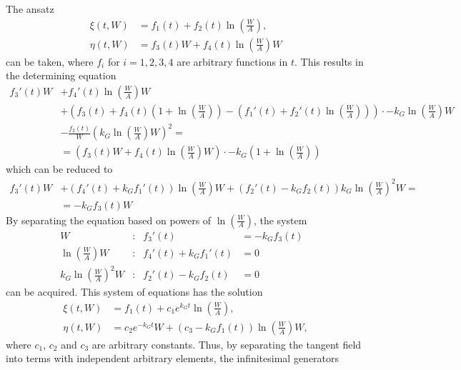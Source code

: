 The ansatz
\begin{align*}
  \xi(t, W) &= f_1(t) + f_2(t) \ln\left(\frac{W}{A}\right),\\
  \eta(t, W) &= f_3(t) W + f_4(t) \ln\left(\frac{W}{A}\right) W
\end{align*}
can be taken, where \(f_i\) for \(i =1,2,3,4\) are arbitrary functions in \(t\).
This results in the determining equation
\begin{align*}
  f_3'(t) W &+ f_4'(t) \ln\left(\frac{W}{A}\right) W \\
  &+ \left( f_3(t) + f_4(t) \left( 1 + \ln\left(\frac{W}{A}\right) \right) - \left( f_1'(t) + f_2'(t) \ln\left(\frac{W}{A}\right) \right) \right) \cdot -k_G \ln\left(\frac{W}{A}\right) W \\
  &- \frac{f_2(t)}{W} \left( k_G \ln\left(\frac{W}{A}\right) W \right)^2 =\\
  &= \left( f_3(t) W + f_4(t) \ln\left(\frac{W}{A}\right) W \right) \cdot -k_G \left( 1 + \ln\left(\frac{W}{A}\right) \right)
\end{align*}
which can be reduced to
\begin{align*}
  f_3'(t) W &+ \left( f_4'(t) + k_G f_1'(t) \right) \ln\left(\frac{W}{A}\right) W + \left( f_2'(t) - k_G f_2(t) \right) k_G \ln\left(\frac{W}{A}\right)^2 W =\\
  &= - k_G f_3(t) W
\end{align*}
By separating the equation based on powers of \(\ln\left(\frac{W}{A}\right)\), the system
\begin{subequations}
  \begin{flalign}
    W & : & f_3'(t) &= -k_G f_3(t) &\label{eq:W}\\
    \ln\left(\frac{W}{A}\right) W & : & f_4'(t) + k_G f_1'(t) &= 0 &\label{eq:WA}\\
    k_G \ln\left(\frac{W}{A}\right)^2 W & : & f_2'(t) - k_G f_2(t) &= 0 &\label{eq:kW2A2W}
  \end{flalign}
\end{subequations}
can be acquired.
This system of equations has the solution
\begin{align*}
  \xi(t, W) &= f_1(t) + c_1 e^{k_G t} \ln\left(\frac{W}{A}\right),\\
  \eta(t, W) &= c_2 e^{-k_G t} W + \left( c_3 - k_G f_1(t) \right) \ln\left(\frac{W}{A}\right) W,
\end{align*}
where \(c_1\), \(c_2\) and \(c_3\) are arbitrary constants.
Thus, by separating the tangent field into terms with independent arbitrary elements, the infinitesimal generators
